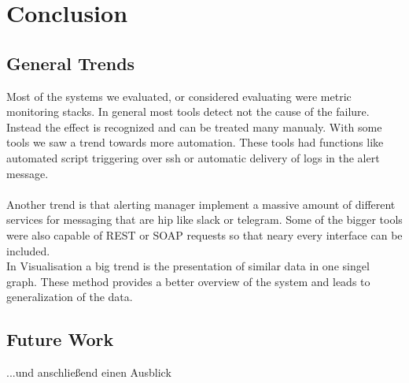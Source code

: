 
\chapter{Conclusion}\label{chap:conclusion}
\section{General Trends}
Most of the systems we evaluated, or considered evaluating were metric monitoring stacks. In general most tools detect not the cause of the failure. Instead the effect is recognized and can be treated many manualy. With some tools we saw a trend towards more automation. These tools had functions like automated script triggering over ssh or automatic delivery of logs in the alert message. \\
\\
Another trend is that alerting manager implement a massive amount of different services for messaging that are hip like slack or telegram. Some of the bigger tools were also capable of REST or SOAP requests so that neary every interface can be included.
\\
In Visualisation a big trend is the presentation of similar data in one singel graph. These method provides a better overview of the system and leads to generalization of the data.
\\

\section*{Future Work}
...und anschließend einen Ausblick

